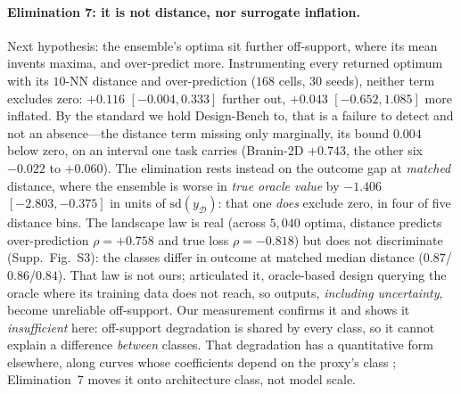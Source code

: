 \documentclass[letterpaper]{article} %
\theoremstyle{plain}
\newcommand{\mdemph}[1]{\emph{#1}}
\newcommand{\D}{\mathcal{D}}
\begin{document}
\paragraph{Elimination 7: it is not distance, nor surrogate inflation.} Next hypothesis: the ensemble's optima sit further off-support, where its mean invents maxima, and over-predict more. Instrumenting every returned optimum with its $10$-NN distance and over-prediction ($168$ cells, $30$ seeds), neither term excludes zero: $+0.116$ $[-0.004,0.333]$ further out, $+0.043$ $[-0.652,1.085]$ more inflated. By the standard we hold Design-Bench to, that is a failure to detect and not an absence---the distance term missing only marginally, its bound $0.004$ below zero, on an interval one task carries (Branin-2D $+0.743$, the other six $-0.022$ to $+0.060$). The elimination rests instead on the outcome gap at \mdemph{matched} distance, where the ensemble is worse in \mdemph{true oracle value} by $-1.406$ $[-2.803,-0.375]$ in units of $\mathrm{sd}(y_\D)$: that one \mdemph{does} exclude zero, in four of five distance bins. The landscape law is real (across $5{,}040$ optima, distance predicts over-prediction $\rho{=}{+}0.758$ and true loss $\rho{=}{-}0.818$) but does not discriminate (Supp.\ Fig.\ S3): the classes differ in outcome at matched median distance ($0.87$/$0.86$/$0.84$). That law is not ours; \citet{fannjiang2020autofocused} articulated it, oracle-based design querying the oracle where its training data does not reach, so outputs, \mdemph{including uncertainty}, become unreliable off-support. Our measurement confirms it and shows it \mdemph{insufficient} here: off-support degradation is shared by every class, so it cannot explain a difference \mdemph{between} classes. That degradation has a quantitative form elsewhere, along curves whose coefficients depend on the proxy's class \citep{gao2023reward}; Elimination~7 moves it onto architecture class, not model scale.
\end{document}

